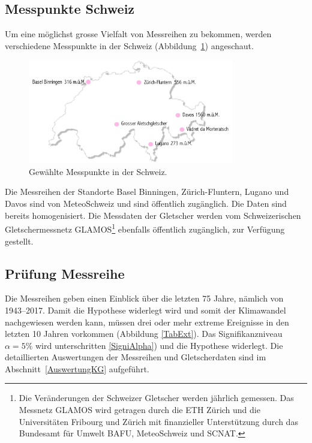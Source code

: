 \begin{refsection}
\section{Messpunkte Schweiz} \label{MesspunkteSchweiz}
Um eine möglichst grosse Vielfalt von Messreihen zu bekommen, werden verschiedene Messpunkte in der Schweiz (Abbildung~\ref{MesspunkteCH}) angeschaut. 

\begin{figure}
\centering
\includegraphics[width=0.8\textwidth]{extrem/Schweiz.pdf}
\caption{Gewählte Messpunkte in der Schweiz.}
\label{MesspunkteCH}
\end{figure}

Die Messreihen der Standorte Basel Binningen, Zürich-Fluntern, Lugano und Davos sind von MeteoSchweiz und sind öffentlich zugänglich. Die Daten sind bereits homogenisiert.
Die Messdaten der Gletscher werden vom Schweizerischen Gletschermessnetz
GLAMOS\footnote{%
Die Veränderungen der Schweizer Gletscher werden jährlich gemessen. Das Messnetz GLAMOS wird getragen durch die ETH Zürich und die Universitäten Fribourg und Zürich mit finanzieller Unterstützung durch das Bundesamt für Umwelt BAFU, MeteoSchweiz und SCNAT.} ebenfalls öffentlich zugänglich, zur Verfügung gestellt.


\subsection{Prüfung Messreihe}
Die Messreihen geben einen Einblick über die letzten 75 Jahre, nämlich von 1943--2017. Damit die Hypothese widerlegt wird und somit der Klimawandel nachgewiesen werden kann, müssen drei oder mehr extreme Ereignisse in den letzten 10 Jahren vorkommen (Abbildung \ref{TabExt}). Das Signifikanzniveau $\alpha = 5\%$ wird unterschritten \ref{SigniAlpha}) und die Hypothese widerlegt.
Die detaillierten Auswertungen der Messreihen und Gletscherdaten sind im Abschnitt~\ref{AuswertungKG} aufgeführt.



\end{refsection}
